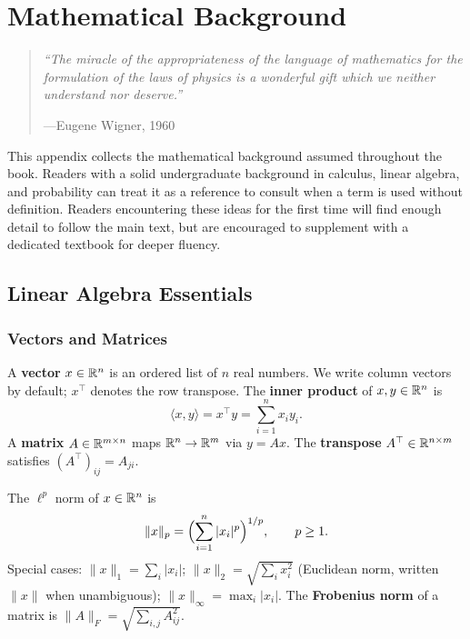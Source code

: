 
\chapter{Mathematical Background}
\label{app:math}

\begin{quote}
\textit{``The miracle of the appropriateness of the language of mathematics
for the formulation of the laws of physics is a wonderful gift which we
neither understand nor deserve.''}
\par\noindent\hfill---Eugene Wigner, 1960
\end{quote}

\bigskip

This appendix collects the mathematical background assumed throughout the
book.  Readers with a solid undergraduate background in calculus, linear
algebra, and probability can treat it as a reference to consult when a
term is used without definition.  Readers encountering these ideas for the
first time will find enough detail to follow the main text, but are
encouraged to supplement with a dedicated textbook for deeper fluency.

\section{Linear Algebra Essentials}
\label{app:linalg}

\subsection*{Vectors and Matrices}

A \textbf{vector} $x \in \mathbb{R}^n$ is an ordered list of $n$ real numbers.
We write column vectors by default; $x^\top$ denotes the row transpose.
The \textbf{inner product} of $x, y \in \mathbb{R}^n$ is
\[
    \langle x, y \rangle = x^\top y = \sum_{i=1}^n x_i y_i.
\]
A \textbf{matrix} $A \in \mathbb{R}^{m \times n}$ maps $\mathbb{R}^n \to \mathbb{R}^m$ via
$y = Ax$.  The \textbf{transpose} $A^\top \in \mathbb{R}^{n \times m}$ satisfies
$(A^\top)_{ij} = A_{ji}$.

\begin{definition}[Norms]
\label{def:norms}
The $\ell^p$ norm of $x \in \mathbb{R}^n$ is
\[
    \|x\|_p = \Bigl(\sum_{i=1}^n |x_i|^p\Bigr)^{1/p}, \qquad p \geq 1.
\]
Special cases: $\|x\|_1 = \sum_i |x_i|$; $\|x\|_2 = \sqrt{\sum_i x_i^2}$
(Euclidean norm, written $\|x\|$ when unambiguous);
$\|x\|_\infty = \max_i |x_i|$.  The \textbf{Frobenius norm} of a matrix is
$\|A\|_F = \sqrt{\sum_{i,j} A_{ij}^2}$.
\end{definition}

